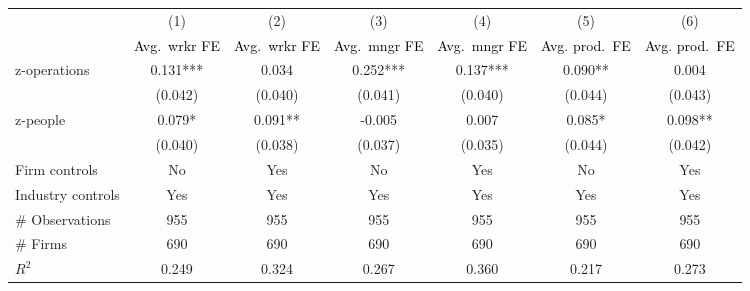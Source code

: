 
\begin{tabular}{l*{6}{c}}
\toprule
                &\multicolumn{1}{c}{(1)}&\multicolumn{1}{c}{(2)}&\multicolumn{1}{c}{(3)}&\multicolumn{1}{c}{(4)}&\multicolumn{1}{c}{(5)}&\multicolumn{1}{c}{(6)}\\
                &\multicolumn{1}{c}{\textcolor{black}{Avg.\ wrkr FE}}&\multicolumn{1}{c}{\textcolor{black}{Avg.\ wrkr FE}}&\multicolumn{1}{c}{\textcolor{black}{Avg.\ mngr FE}}&\multicolumn{1}{c}{\textcolor{black}{Avg.\ mngr FE}}&\multicolumn{1}{c}{\textcolor{black}{Avg. prod.\ FE}}&\multicolumn{1}{c}{\textcolor{black}{Avg. prod.\ FE}}\\
\midrule
z-operations    &    0.131***&    0.034   &    0.252***&    0.137***&    0.090** &    0.004   \\
                &  (0.042)   &  (0.040)   &  (0.041)   &  (0.040)   &  (0.044)   &  (0.043)   \\
z-people        &    0.079*  &    0.091** &   -0.005   &    0.007   &    0.085*  &    0.098** \\
                &  (0.040)   &  (0.038)   &  (0.037)   &  (0.035)   &  (0.044)   &  (0.042)   \\
Firm controls   &       No   &      Yes   &       No   &      Yes   &       No   &      Yes   \\
Industry controls &      Yes   &      Yes   &      Yes   &      Yes   &      Yes   &      Yes   \\
\midrule
\# Observations &\multicolumn{1}{c}{955}   &\multicolumn{1}{c}{955}   &\multicolumn{1}{c}{955}   &\multicolumn{1}{c}{955}   &\multicolumn{1}{c}{955}   &\multicolumn{1}{c}{955}   \\
\# Firms        &      690   &      690   &      690   &      690   &      690   &      690   \\
\(R^{2}\)       &    0.249   &    0.324   &    0.267   &    0.360   &    0.217   &    0.273   \\
\bottomrule
\end{tabular}
